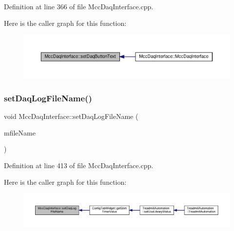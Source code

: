 Definition at line 366 of file Mcc\+Daq\+Interface.\+cpp.

Here is the caller graph for this function\+:
\nopagebreak
\begin{figure}[H]
\begin{center}
\leavevmode
\includegraphics[width=350pt]{class_mcc_daq_interface_a43bef970ad375bca8b4c5892346629b6_icgraph}
\end{center}
\end{figure}
\mbox{\label{class_mcc_daq_interface_aac1bb00fead8900d77ea1fc732f8b7b7}} 
\subsubsection{\texorpdfstring{set\+Daq\+Log\+File\+Name()}{setDaqLogFileName()}}
{\footnotesize\ttfamily void Mcc\+Daq\+Interface\+::set\+Daq\+Log\+File\+Name (\begin{DoxyParamCaption}\item[{Q\+String}]{mfile\+Name }\end{DoxyParamCaption})}



Definition at line 413 of file Mcc\+Daq\+Interface.\+cpp.

Here is the caller graph for this function\+:
\nopagebreak
\begin{figure}[H]
\begin{center}
\leavevmode
\includegraphics[width=350pt]{class_mcc_daq_interface_aac1bb00fead8900d77ea1fc732f8b7b7_icgraph}
\end{center}
\end{figure}
\mbox{\label{class_mcc_daq_interface_aaaf6dfded2d522b1310c7f7dc3171168}} 
